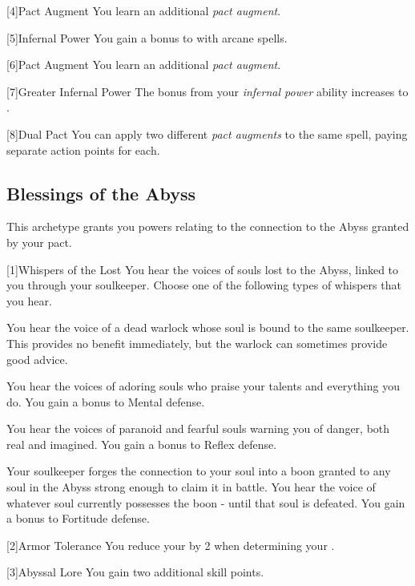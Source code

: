        [4]{Pact Augment} You learn an additional \textit{pact augment}.

        [5]{Infernal Power}
        You gain a  bonus to  with arcane spells.

        [6]{Pact Augment} You learn an additional \textit{pact augment}.

        [7]{Greater Infernal Power}
        The bonus from your \textit{infernal power} ability increases to .

        [8]{Dual Pact} You can apply two different \textit{pact augments} to the same spell, paying separate action points for each.

    \subsection{Blessings of the Abyss}
        This archetype grants you powers relating to the connection to the Abyss granted by your pact.

        [1]{Whispers of the Lost} You hear the voices of souls lost to the Abyss, linked to you through your soulkeeper.
        Choose one of the following types of whispers that you hear.
        {
             You hear the voice of a dead warlock whose soul is bound to the same soulkeeper.
            This provides no benefit immediately, but the warlock can sometimes provide good advice.

             You hear the voices of adoring souls who praise your talents and everything you do.
            You gain a  bonus to Mental defense.

             You hear the voices of paranoid and fearful souls warning you of danger, both real and imagined.
            You gain a  bonus to Reflex defense.

             Your soulkeeper forges the connection to your soul into a boon granted to any soul in the Abyss strong enough to claim it in battle.
            You hear the voice of whatever soul currently possesses the boon - until that soul is defeated.
            You gain a  bonus to Fortitude defense.
        }

        [2]{Armor Tolerance} You reduce your  by 2 when determining your .

        [3]{Abyssal Lore} You gain two additional skill points.

